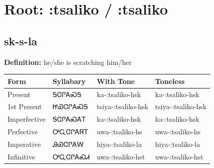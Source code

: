 \documentclass{article}%
\begin{document}
%
\normalsize%
\section*{Root: :tsaliko / :tsaliko}%
\subsection*{sk-s-la}%
\textbf{Definition: }%
he/she is scratching him/her%
\\[0.5em]%
\begin{tabular}{|l|l|l|l|}%
\hline%
\textbf{Form}&\textbf{Syllabary}&\textbf{With Tone}&\textbf{Toneless}\\%
\hline%
Present&ᎦᏣᎵᎪᏍᎦ&ka{-}:tsaliko{-}hsk&ka{-}:tsaliko{-}hsk\\%
1st Present&ᏥᏯᏣᎵᎪᏍᎦ&tsiya{-}:tsaliko{-}hsk&tsiya{-}:tsaliko{-}hsk\\%
Imperfective&ᎦᏣᎵᎪᏍᎪᎢ&ka{-}:tsaliko{-}hsk&ka{-}:tsaliko{-}hsk\\%
Perfective&ᎤᏩᏣᎵᎪᏒᎢ&uwa{-}:tsaliko{-}hs&uwa{-}:tsaliko{-}hs\\%
Imperative&ᎯᏯᏣᎵᎪᎳ&hiya{-}:tsaliko{-}la&hiya{-}:tsaliko{-}la\\%
Infinitive&ᎤᏩᏣᎵᎪᏍᏗ&uwa{-}:tsaliko{-}hst&uwa{-}:tsaliko{-}hst\\%
\hline%
\end{tabular}%
\\[1em]%
\end{document}
